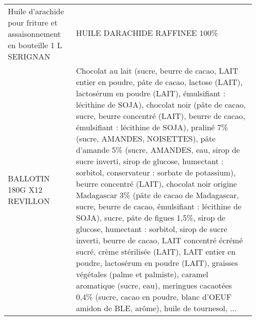 \begin{longtable}{p{5cm}p{10cm}}
                                Huile d'arachide pour friture et assaisonnement en bouteille 1 L SERIGNAN &                                                                                                                                                                                                                                                                                                                                                                                                                                                                                                                                                                                                                                                                                                                                                                                                                                                                                                                                                                                                           HUILE DARACHIDE RAFFINEE 100\% \\
                                                                               BALLOTIN 180G X12 REVILLON &  Chocolat au lait (sucre, beurre de cacao, LAIT entier en poudre, pâte de cacao, lactose (LAIT), lactosérum en poudre (LAIT), émulsifiant : lécithine de SOJA), chocolat noir (pâte de cacao, sucre, beurre concentré (LAIT), beurre de cacao, émulsifiant : lécithine de SOJA), praliné 7\% (sucre, AMANDES, NOISETTES), pâte d'amande 5\% (sucre, AMANDES, eau, sirop de sucre inverti, sirop de glucose, humectant : sorbitol, conservateur : sorbate de potassium), beurre concentré (LAIT), chocolat noir origine Madagascar 3\% (pâte de cacao de Madagascar, sucre, beurre de cacao, émulsifiant : lécithine de SOJA), sucre, pâte de figues 1,5\%, sirop de glucose, humectant : sorbitol, sirop de sucre inverti, beurre de cacao, LAIT concentré écrémé sucré, crème stérilisée (LAIT), LAIT entier en poudre, lactosérum en poudre (LAIT), graisses végétales (palme et palmiste), caramel aromatique (sucre, eau), meringues cacaotées 0,4\% (sucre, cacao en poudre, blanc d'OEUF amidon de BLE, arôme), huile de tournesol, ... \\

\end{longtable}
